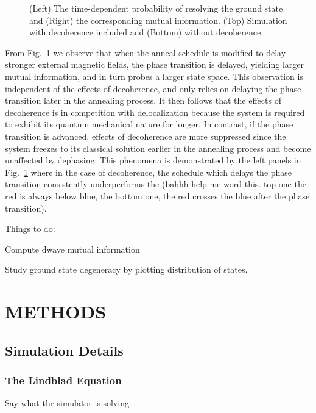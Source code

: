 \documentclass[prd,twocolumn,tightenlines,preprintnumbers,showpacs,superscriptaddress,notitlepage,nofootinbib,eqsecnum,floatfix,longbibliography]{revtex4}
\begin{document}
\begin{figure}
    \caption{(Left) The time-dependent probability of resolving the ground state and (Right) the corresponding mutual information.
(Top) Simulation with decoherence included and (Bottom) without decoherence.}
    \label{fig:prob_mi}
\end{figure}

From Fig.~\ref{fig:prob_mi} we observe that when the anneal schedule is modified to delay stronger external magnetic fields, the phase transition is delayed, yielding larger mutual information, and in turn probes a larger state space.
This observation is independent of the effects of decoherence, and only relies on delaying the phase transition later in the annealing process.
It then follows that the effects of decoherence is in competition with delocalization because the system is required to exhibit its quantum mechanical nature for longer.
In contrast, if the phase transition is advanced, effects of decoherence are more suppressed since the system freezes to its classical solution earlier in the annealing process and {\color{blue}become unaffected by dephasing.} This phenomena is demonstrated by the left panels in Fig.~\ref{fig:prob_mi} where in the case of decoherence, the schedule which delays the phase transition consistently underperforms the (bahhh help me word this.
top one the red is always below blue, the bottom one, the red crosses the blue after the phase transition).

Things to do:

Compute dwave mutual information

Study ground state degeneracy by plotting distribution of states.

\section{METHODS}
\subsection{Simulation Details}
\subsubsection{The Lindblad Equation}
\label{sec:methods:lindblad}
Say what the simulator is solving
\end{document}
